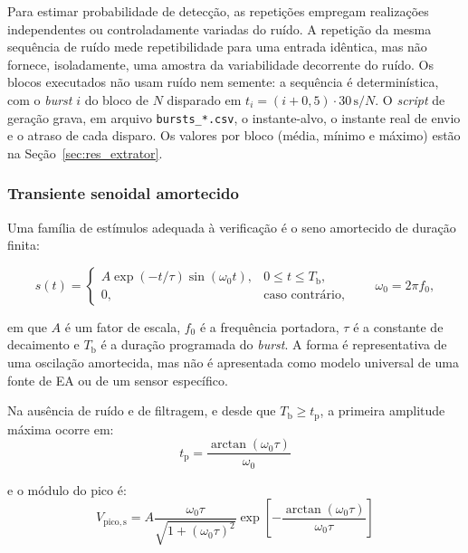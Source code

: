 Para estimar probabilidade de detecção, as repetições empregam realizações independentes ou controladamente variadas do ruído. A repetição da mesma sequência de ruído mede repetibilidade para uma entrada idêntica, mas não fornece, isoladamente, uma amostra da variabilidade decorrente do ruído. Os blocos executados não usam ruído nem semente: a sequência é determinística, com o \textit{burst} \(i\) do bloco de \(N\) disparado em \(t_i = (i + 0{,}5)\cdot 30\,\mathrm{s}/N\). O \textit{script} de geração grava, em arquivo \texttt{bursts\_*.csv}, o instante-alvo, o instante real de envio e o atraso de cada disparo. Os valores por bloco (média, mínimo e máximo) estão na Seção~\ref{sec:res_extrator}.

\subsubsection{Transiente senoidal amortecido}
Uma família de estímulos adequada à verificação é o seno amortecido de duração finita:

\begin{equation}
	s(t) =
	\begin{cases} 
		A \exp\left(-t/\tau\right) 	\sin\left(\omega_0 t\right), &
		0\leq t\leq T_{\mathrm{b}},\\[0.2cm] 0,
		&
		\text{caso contrário},
	\end{cases}
	\qquad
	\omega_0=2\pi f_0, 
	\label{v2:eq:seno_amortecido}
\end{equation}

\noindent
em que \(A\) é um fator de escala, \(f_0\) é a frequência portadora, \(\tau\) é a constante de decaimento e \(T_{\mathrm{b}}\) é a duração programada do \textit{burst}. A forma é representativa de uma oscilação amortecida, mas não é apresentada como modelo universal de uma fonte de EA ou de um sensor específico.

Na ausência de ruído e de filtragem, e desde que \(T_{\mathrm{b}}\geq t_{\mathrm{p}}\), a primeira amplitude máxima ocorre em:
\begin{equation}
	t_{\mathrm{p}} = \frac{\arctan\left(\omega_0\tau\right)}{\omega_0}
	\label{v2:eq:tempo_pico_seno_amortecido}
\end{equation}

\noindent
e o módulo do pico é:
\begin{equation}
	V_{\mathrm{pico,s}} = A \frac{\omega_0\tau}{\sqrt{1+\left(\omega_0\tau\right)^2}}\exp \left[-\frac{\arctan\left(\omega_0\tau\right)}{\omega_0\tau}\right]
	\label{v2:eq:pico_seno_amortecido}
\end{equation}

